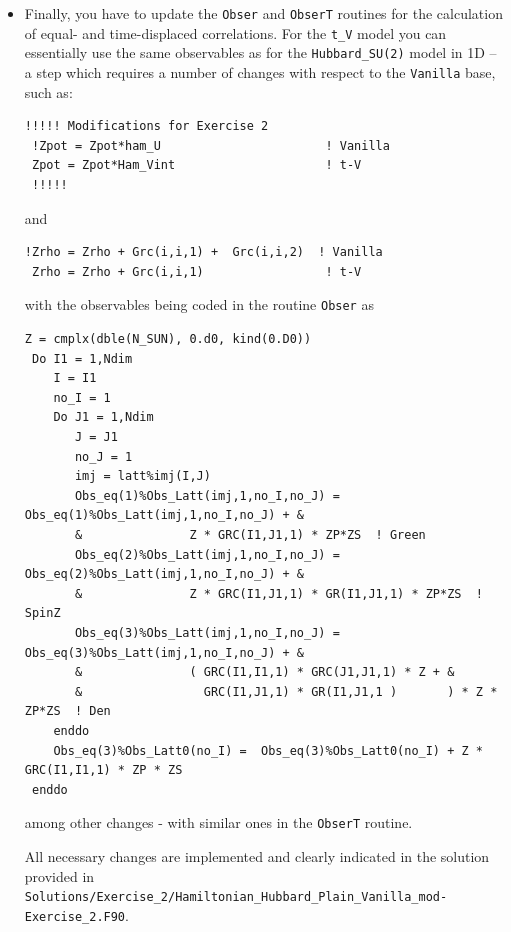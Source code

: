 \documentclass[10pt,modern]{scrartcl}
\numberwithin{exerciseitem}{exercise} %
\begin{document}
\begin{itemize}
 
\begin{lstlisting}[style=fortran]
Allocate(Op_V(Ndim,N_FL))
 do nf = 1,N_FL
    do i  =  1, Ndim
       call Op_make(Op_V(i,nf),2)
    enddo
 enddo
 Do i = 1, Ndim  ! Runs over bonds = # of lattice sites in one-dimension. 
    i2                = Latt%nnlist(i,1,0)
    Op_V(i,nf)%P(1)   = i
    Op_V(i,nf)%P(2)   = i2
    Op_V(i,nf)%O(1,2) = cmplx(1.d0 ,0.d0, kind(0.d0))
    Op_V(i,nf)%O(2,1) = cmplx(1.d0 ,0.d0, kind(0.d0)) 
    Op_V(i,nf)%g      = sqrt(cmplx(Dtau*Ham_Vint/2.d0, 0.d0, kind(0.d0)))  
    Op_V(i,nf)%alpha  = cmplx(0d0  ,0.d0, kind(0.d0))
    Op_V(i,nf)%type   = 2
    Call Op_set( Op_V(i,nf) )
 enddo
\end{lstlisting}
\item  Finally, you have to update the \texttt{Obser} and \texttt{ObserT} routines for the calculation of equal- and time-displaced correlations. For the \texttt{t\_V} model you can essentially use the same observables as for the \texttt{Hubbard\_SU(2)} model in 1D -- a step which requires a number of changes with respect to the \texttt{Vanilla} base, such as:
\begin{lstlisting}[style=fortran]
!!!!! Modifications for Exercise 2
 !Zpot = Zpot*ham_U                       ! Vanilla
 Zpot = Zpot*Ham_Vint                     ! t-V
 !!!!!
\end{lstlisting}
and
\begin{lstlisting}[style=fortran]
!Zrho = Zrho + Grc(i,i,1) +  Grc(i,i,2)  ! Vanilla
 Zrho = Zrho + Grc(i,i,1)                 ! t-V
\end{lstlisting}
with the observables being coded in the routine \texttt{Obser} as
\begin{lstlisting}[style=fortran]
Z = cmplx(dble(N_SUN), 0.d0, kind(0.D0))
 Do I1 = 1,Ndim
    I = I1
    no_I = 1
    Do J1 = 1,Ndim
       J = J1
       no_J = 1
       imj = latt%imj(I,J)
       Obs_eq(1)%Obs_Latt(imj,1,no_I,no_J) =  Obs_eq(1)%Obs_Latt(imj,1,no_I,no_J) + &
       &               Z * GRC(I1,J1,1) * ZP*ZS  ! Green
       Obs_eq(2)%Obs_Latt(imj,1,no_I,no_J) =  Obs_eq(2)%Obs_Latt(imj,1,no_I,no_J) + &
       &               Z * GRC(I1,J1,1) * GR(I1,J1,1) * ZP*ZS  ! SpinZ
       Obs_eq(3)%Obs_Latt(imj,1,no_I,no_J) =  Obs_eq(3)%Obs_Latt(imj,1,no_I,no_J) + &
       &               ( GRC(I1,I1,1) * GRC(J1,J1,1) * Z + &
       &                 GRC(I1,J1,1) * GR(I1,J1,1 )       ) * Z * ZP*ZS  ! Den
    enddo
    Obs_eq(3)%Obs_Latt0(no_I) =  Obs_eq(3)%Obs_Latt0(no_I) + Z * GRC(I1,I1,1) * ZP * ZS
 enddo
\end{lstlisting}
among other changes - with similar ones in the \texttt{ObserT} routine.

All necessary changes are implemented and clearly indicated in the solution provided in \texttt{Solutions/Exercise\_2/Hamiltonian\_Hubbard\_Plain\_Vanilla\_mod-Exercise\_2.F90}.
\end{itemize}
\end{document}
